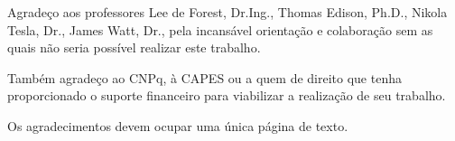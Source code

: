 \noindent%
Agradeço aos professores Lee de Forest, Dr.Ing., Thomas Edison,
Ph.D., Nikola Tesla, Dr., James Watt, Dr., pela incansável orientação e colaboração sem as quais não seria possível realizar este trabalho.

\noindent%
Também agradeço ao CNPq, à CAPES ou a quem de direito que tenha proporcionado o suporte financeiro para viabilizar a realização de seu trabalho.

\noindent%
Os agradecimentos devem ocupar uma única página de texto.
\vfill